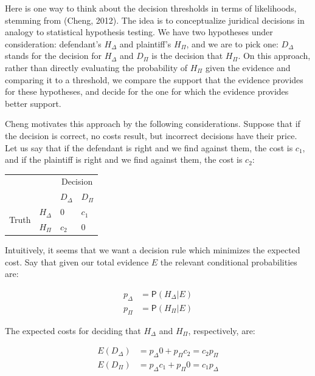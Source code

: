 \documentclass[10pt,dvipsnames,enabledeprecatedfontcommands]{scrartcl}
\newcommand{\pr}[1]{\mathsf{P}(#1)}
\begin{document}
Here is one way to think about the decision thresholds in terms of
likelihoods, stemming from (Cheng, 2012). The idea is to conceptualize
juridical decisions in analogy to statistical hypothesis testing. We
have two hypotheses under consideration: defendant's \(H_\Delta\) and
plaintiff's \(H_\Pi\), and we are to pick one: \(D_\Delta\) stands for
the decision for \(H_\Delta\) and \(D_\Pi\) is the decision that
\(H_\Pi\). On this approach, rather than directly evaluating the
probability of \(H_\Pi\) given the evidence and comparing it to a
threshold, we compare the support that the evidence provides for these
hypotheses, and decide for the one for which the evidence provides
better support.

Cheng motivates this approach by the following considerations. Suppose
that if the decision is correct, no costs result, but incorrect
decisions have their price. Let us say that if the defendant is right
and we find against them, the cost is \(c_1\), and if the plaintiff is
right and we find against them, the cost is \(c_2\):

\begin{center}
\begin{tabular}
{@{}llll@{}}
\toprule
& & \multicolumn{2}{c}{Decision}\\
& &  $D_\Delta$ & $D_\Pi$ \\
\cmidrule{3-4}
\multirow{2}{*}{Truth} &  $H_\Delta$    & $0$    & $c_1$\\
                       &  $H_\Pi$       &  $c_2$   & $0$ \\ 
\bottomrule
\end{tabular}
\end{center}

Intuitively, it seems that we want a decision rule which minimizes the
expected cost. Say that given our total evidence \(E\) the relevant
conditional probabilities are:

\vspace{-6mm}

\begin{align*}
p_\Delta &= \pr{H_\Delta \vert E} \\
p_\Pi & = \pr{H_\Pi \vert E}
\end{align*}

\noindent The expected costs for deciding that \(H_\Delta\) and
\(H_\Pi\), respectively, are:

\begin{align*}
E(D_\Delta) & = p_\Delta 0 + p_\Pi c_2 = c_2p_\Pi\\
E(D_\Pi) & = p_\Delta c_1 + p_\Pi 0 = c_1 p_\Delta
\end{align*}
\end{document}
